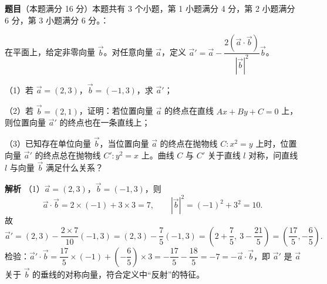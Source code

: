 \begin{answer}

\textbf{题目}（本题满分 16 分）本题共有 3 个小题，第 1 小题满分 4 分，第 2 小题满分 6 分，第 3 小题满分 6 分。：

在平面上，给定非零向量 $\vec b$。对任意向量 $\vec a$，定义 $\vec a'=\vec a-\dfrac{2\left(\vec a\cdot\vec b\right)}{\left|\vec b\right|^2}\vec b$。

（1）若 $\vec a=(2,3)$，$\vec b=(-1,3)$，求 $\vec a'$；

（2）若 $\vec b=(2,1)$，证明：若位置向量 $\vec a$ 的终点在直线 $Ax+By+C=0$ 上，则位置向量 $\vec a'$ 的终点也在一条直线上；

（3）已知存在单位向量 $\vec b$，当位置向量 $\vec a$ 的终点在抛物线 $C:x^2=y$ 上时，位置向量 $\vec a'$ 的终点总在抛物线 $C':y^2=x$ 上。曲线 $C$ 与 $C'$ 关于直线 $l$ 对称，问直线 $l$ 与向量 $\vec b$ 满足什么关系？

\textbf{解析}
（1）$\vec a=(2,3)$，$\vec b=(-1,3)$，则
\nopagebreak[4]
\[\vec a\cdot\vec b=2\times(-1)+3\times3=7,\qquad\left|\vec b\right|^2=(-1)^2+3^2=10.\]
故
\nopagebreak[4]
\[\vec a'=(2,3)-\frac{2\times7}{10}(-1,3)=(2,3)-\frac75(-1,3)=\left(2+\frac75,\ 3-\frac{21}{5}\right)=\left(\frac{17}{5},-\frac65\right).\]
检验：$\vec a'\cdot\vec b=\dfrac{17}{5}\times(-1)+\left(-\dfrac65\right)\times3=-\dfrac{17}{5}-\dfrac{18}{5}=-7=-\vec a\cdot\vec b$，即 $\vec a'$ 是 $\vec a$ 关于 $\vec b$ 的垂线的对称向量，符合定义中“反射”的特征。


\end{answer}
